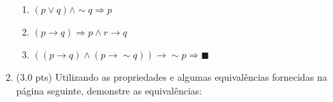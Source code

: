 \documentclass[12pt]{article}
\begin{document}
\begin{enumerate}
\begin{enumerate}

\item  $ (p \vee q) \wedge \sim q \Rightarrow p $




\item $(p \rightarrow q) \Rightarrow p \wedge r \rightarrow q $


\item $((p \rightarrow q) \wedge (p \rightarrow \sim q)) \rightarrow \sim p \Rightarrow  \blacksquare$



\end{enumerate}


\item (3.0 pts) Utilizando as propriedades e algumas equivalências
fornecidas na página seguinte, demonstre as equivalências:
\begin{enumerate}
\setlength{\itemsep}{-2pt}






\end{enumerate}
\end{enumerate}
\end{document}

